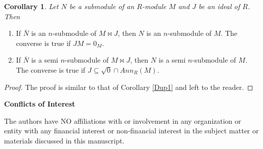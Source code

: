\documentclass{amsart}%
\theoremstyle{plain}
\newtheorem{corollary}{Corollary}
\numberwithin{equation}{section}
\begin{document}
\begin{corollary}
\label{Dup2}Let $N$ be a submodule of an $R$-module $M$ and $J$ be an ideal of
$R$. Then
\end{corollary}

\begin{enumerate}
\item If $\bar{N}$ is an $n$-submodule of $M\Join J$, then $N$ is an
$n$-submodule of $M$. The converse is true if $JM=0_{M}$.

\item If $\bar{N}$ is a semi $n$-submodule of $M\Join J$, then $N$ is a semi
$n$-submodule of $M$. The converse is true if $J\subseteq\sqrt{0}\cap
Ann_{R}(M)$.
\end{enumerate}

\begin{proof}
The proof is similar to that of Corollary \ref{Dup1} and left to the reader.
\end{proof}

\medskip

\textbf{Conflicts of Interest}

The authors have NO affiliations with or involvement in any organization or
entity with any financial interest or non-financial interest in the subject
matter or materials discussed in this manuscript.\medskip
\end{document}
